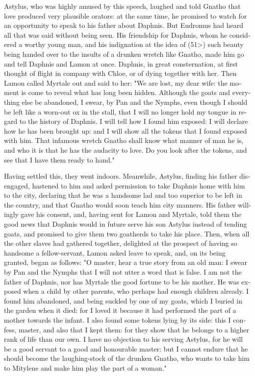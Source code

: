 \documentclass{book}
\begin{document}
\begin{pairs}
\begin{Rightside}
\begin{english}
  Astylus, who was highly amused by this speech, laughed and told Gnatho that love produced very plausible orators: at the same time, he promised to watch for an opportunity to speak to his father about Daphnis.  But Eudromus had heard all that was said without being seen.  His friendship for Daphnis, whom he considered a worthy young man, and his indignation at the idea of (51>) such beauty being handed over to the insults of a drunken wretch like Gnatho, made him go and tell Daphnis and Lamon at once.  Daphnis, in great consternation, at first thought of flight in company with Chloe, or of dying together with her.  Then Lamon called Myrtale out and said to her: "We are lost, my dear wife: the moment is come to reveal what has long been hidden.  Although the goats and everything else be abandoned, I swear, by Pan and the Nymphs, even though I should be left like a worn-out ox in the stall, that I will no longer hold my tongue in regard to the history of Daphnis.  I will tell how I found him exposed: I will declare how he has been brought up: and I will show all the tokens that I found exposed with him.  That infamous wretch Gnatho shall know what manner of man he is, and who it is that he has the audacity to love.  Do you look after the tokens, and see that I have them ready to hand."
\pend


  Having settled this, they went indoors.  Meanwhile, Astylus, finding his father disengaged, hastened to him and asked permission to take Daphnis home with him to the city, declaring that he was a handsome lad and too superior to be left in the country, and that Gnatho would soon teach him city manners.  His father willingly gave his consent, and, having sent for Lamon and Myrtale, told them the good news that Daphnis would in future serve his son Astylus instead of tending goats, and promised to give them two goatherds to take his place.  Then, when all the other slaves had gathered together, delighted at the prospect of having so handsome a fellow-servant, Lamon asked leave to speak, and, on its being granted, began as follows:  "O master, hear a true story from an old man: I swear by Pan and the Nymphs that I will not utter a word that is false.  I am not the father of Daphnis, nor has Myrtale the good fortune to be his mother.  He was exposed when a child by other parents, who perhaps had enough children already.  I found him abandoned, and being suckled by one of my goats, which I buried in the garden when it died: for I loved it because it had performed the part of a mother towards the infant.  I also found some tokens lying by its side: this I confess, master, and also that I kept them: for they show that he belongs to a higher rank of life than our own.  I have no objection to his serving Astylus, for he will be a good servant to a good and honourable master: but I cannot endure that he should become the laughing-stock of the drunken Gnatho, who wants to take him to Mitylene and make him play the part of a woman."
\pend



\end{english}
\end{Rightside}
\end{pairs}
\end{document}
